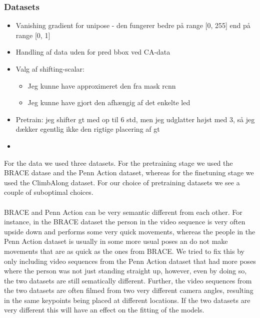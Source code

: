 \documentclass[./main.tex]{subfiles}
\begin{document}
\subsubsection{Datasets}
\begin{itemize}
    \item Vanishing gradient for unipose - den fungerer bedre på range [0, 255] end på range [0, 1]
    \item Handling af data uden for pred bbox ved CA-data
    \item Valg af shifting-scalar:
    \begin{itemize}
        \item Jeg kunne have approximeret den fra mask rcnn
        \item Jeg kunne have gjort den afhængig af det enkelte led
    \end{itemize}
    \item Pretrain: jeg shifter gt med op til 6 std, men jeg udglatter højst med 3, så jeg dækker egentlig ikke den rigtige placering af gt
    \item 
\end{itemize}
For the data we used three datasets. For the pretraining stage we used the BRACE datase and the Penn Action dataset, whereas for the finetuning stage we used the ClimbAlong dataset. For our choice of pretraining datasets we see a couple of suboptimal choices. 
\\
\\
BRACE and Penn Action can be very semantic different from each other. For instance, in the BRACE dataset the person in the video sequence is very often upside down and performs some very quick movements, whereas the people in the Penn Action dataset is usually in some more usual poses an do not make movements that are as quick as the ones from BRACE. We tried to fix this by only including video sequences from the Penn Action dataset that had more poses where the person was not just standing straight up, however, even by doing so, the two datasets are still sematically different. Further, the video sequences from the two datasets are often filmed from two very different camera angles, resulting in the same keypoints being placed at different locations. If the two datasets are very different this will have an effect on the fitting of the models.
\\
\\
\end{document}
